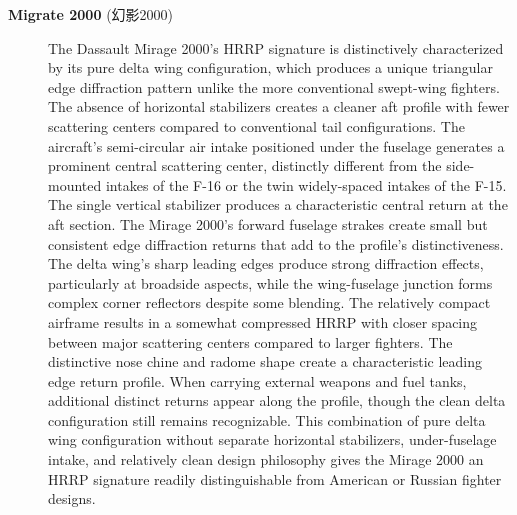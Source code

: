 {\begin{description}
    \item[\textbf{Migrate 2000} (幻影2000)]
    The Dassault Mirage 2000's HRRP signature is distinctively characterized by its pure delta wing configuration, which produces a unique triangular edge diffraction pattern unlike the more conventional swept-wing fighters. The absence of horizontal stabilizers creates a cleaner aft profile with fewer scattering centers compared to conventional tail configurations. The aircraft's semi-circular air intake positioned under the fuselage generates a prominent central scattering center, distinctly different from the side-mounted intakes of the F-16 or the twin widely-spaced intakes of the F-15. The single vertical stabilizer produces a characteristic central return at the aft section. The Mirage 2000's forward fuselage strakes create small but consistent edge diffraction returns that add to the profile's distinctiveness. The delta wing's sharp leading edges produce strong diffraction effects, particularly at broadside aspects, while the wing-fuselage junction forms complex corner reflectors despite some blending. The relatively compact airframe results in a somewhat compressed HRRP with closer spacing between major scattering centers compared to larger fighters. The distinctive nose chine and radome shape create a characteristic leading edge return profile. When carrying external weapons and fuel tanks, additional distinct returns appear along the profile, though the clean delta configuration still remains recognizable. This combination of pure delta wing configuration without separate horizontal stabilizers, under-fuselage intake, and relatively clean design philosophy gives the Mirage 2000 an HRRP signature readily distinguishable from American or Russian fighter designs.


\end{description}}
